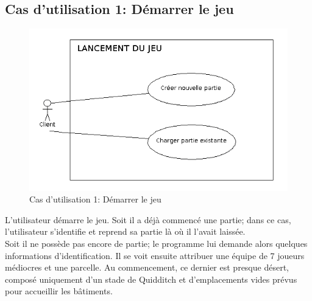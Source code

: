 \documentclass[a4paper,titlepage]{scrreprt}
\begin{document}
  \subsection{Cas d'utilisation 1: Démarrer le jeu}
  \begin{figure}[H]
    \center
    \includegraphics[scale=0.5]{uml/useCaseView/Lancementdujeu.png}
    \caption{Cas d'utilisation 1: Démarrer le jeu}
  \end{figure}  
    L'utilisateur démarre le jeu. Soit il a déjà commencé une \gls{partie}; dans ce cas, l'utilisateur s'identifie et reprend sa partie là où il l'avait laissée. \\
    Soit il ne possède pas encore de partie; le programme lui demande alors quelques informations d'identification. 
    Il se voit ensuite attribuer une équipe de 7 \gls{joueur}s médiocres et une \gls{parcelle}. 
    Au commencement, ce dernier est presque désert, composé uniquement d'un 
    \gls{stade} de \gls{Quidditch} et d'emplacements vides prévus pour accueillir les bâtiments.
\end{document}
